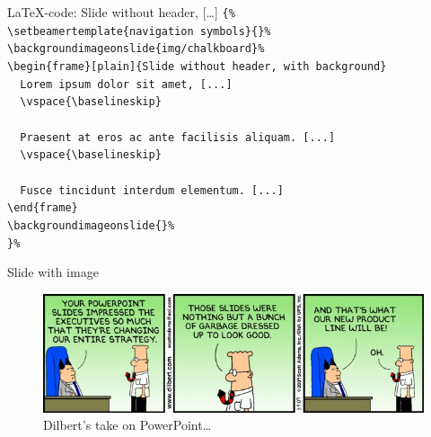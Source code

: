 \documentclass[t,11pt]{beamer}
\begin{document}
\toggleslidecolors
\begin{frame}[fragile]{\LaTeX-code: Slide without header, [\ldots]}
\footnotesize
\verb|{%|\\
\verb|\setbeamertemplate{navigation symbols}{}%|\\
\verb|\backgroundimageonslide{img/chalkboard}%|\\
\verb|\begin{frame}[plain]{Slide without header, with background}|\\
\verb|  Lorem ipsum dolor sit amet, [...]|\\
\verb|  \vspace{\baselineskip}|\\
\verb||\\
\verb|  Praesent at eros ac ante facilisis aliquam. [...]|\\
\verb|  \vspace{\baselineskip}|\\
\verb||\\
\verb|  Fusce tincidunt interdum elementum. [...]|\\
\verb|\end{frame}|\\
\verb|\backgroundimageonslide{}%|\\
\verb|}%|\\
\end{frame}
\toggleslidecolors

\begin{frame}{Slide with image}
\vfill %
\begin{figure}
\includegraphics[width=.99\textwidth,height=.75\textheight,keepaspectratio]{img/dilbert-on-ppt}
\caption{Dilbert's take on PowerPoint\ldots}
\end{figure}
\end{frame}
\end{document}
